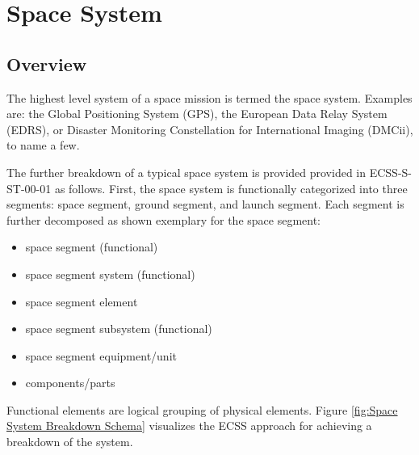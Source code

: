 \chapter{Space System}

\section{Overview}

The highest level system of a space mission is termed the space system. Examples are: the Global Positioning System (GPS), the European Data Relay System (EDRS), or Disaster Monitoring Constellation for International Imaging (DMCii), to name a few.

The further breakdown of a typical space system is provided provided in ECSS-S-ST-00-01 \cite{ECSS-S-ST-00-01} as follows. First, the space system is functionally categorized into three segments: space segment, ground segment, and launch segment. Each segment is further decomposed as shown exemplary for the space segment:

\begin{itemize}
\item space segment (functional)
\item space segment system (functional)
\item space segment element 
\item space segment subsystem (functional)
\item space segment equipment/unit
\item components/parts
\end{itemize}

Functional elements are logical grouping of physical elements. Figure \ref{fig:Space System Breakdown Schema} visualizes the ECSS approach for achieving a breakdown of the system.

